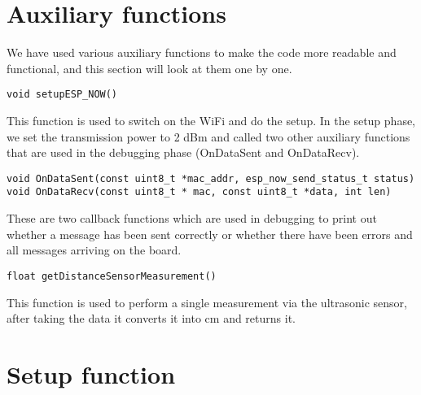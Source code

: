 \section{Auxiliary functions}
We have used various auxiliary functions to make the code more readable and functional, and this section will look at them one by one. \\
\begin{verbatim}
void setupESP_NOW()
\end{verbatim}
This function is used to switch on the WiFi and do the setup.
In the setup phase, we set the transmission power to 2 dBm and called two other auxiliary functions that are used in the debugging phase (OnDataSent and OnDataRecv). \\
\begin{verbatim}
void OnDataSent(const uint8_t *mac_addr, esp_now_send_status_t status)
void OnDataRecv(const uint8_t * mac, const uint8_t *data, int len) 
\end{verbatim}
These are two callback functions which are used in debugging to print out whether a message has been sent correctly or whether there have been errors and all messages arriving on the board. \\
\begin{verbatim}
float getDistanceSensorMeasurement()
\end{verbatim}
This function is used to perform a single measurement via the ultrasonic sensor, after taking the data it converts it into cm and returns it.

\section{Setup function}







